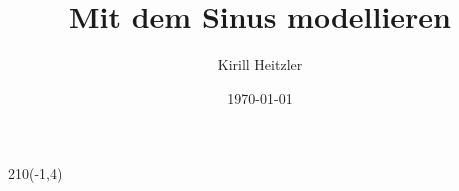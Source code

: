 \documentclass[12pt,a4paper]{article}
\title{Mit dem Sinus modellieren}
\author{Kirill Heitzler}
\date{\today}
\begin{document}
\maketitle
\begin{textblock}{210}(-1,4)
	\begin{figure}[h!]
	\end{figure}
\end{textblock}
\newpage

\tableofcontents
\newpage



\newpage

\newpage

\newpage

\end{document}
